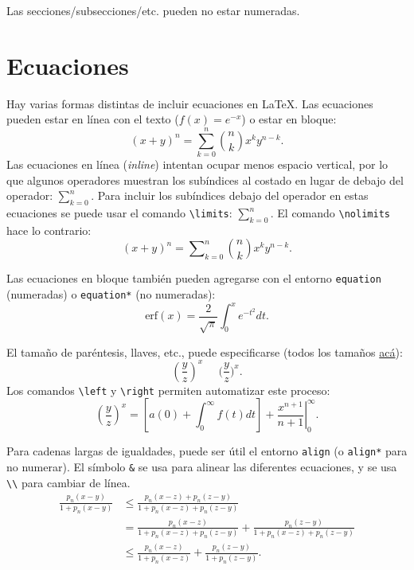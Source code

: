 \documentclass[12pt, spanish]{article}
\theoremstyle{definition} %
\theoremstyle{remark} %
\theoremstyle{plain} %
\theoremstyle{plain} %
\theoremstyle{plain} %
\theoremstyle{plain} %
\theoremstyle{plain} %
\theoremstyle{remark} %
\begin{document}
Las secciones/subsecciones/etc. pueden no estar numeradas.


\section{Ecuaciones}

Hay varias formas distintas de incluir ecuaciones en \LaTeX. Las ecuaciones pueden estar en línea con el texto ($f(x) = e^{-x}$) o estar en bloque: 
\[
(x+y)^n = \sum_{k=0}^n \binom{n}{k} x^k y^{n-k}.
\]
Las ecuaciones en línea (\textit{inline}) intentan ocupar menos espacio vertical, por lo que algunos operadores muestran los subíndices al costado en lugar de debajo del operador: $\sum_{k=0}^n$. Para incluir los subíndices debajo del operador en estas ecuaciones se puede usar el comando \verb|\limits|: $\sum\limits_{k=0}^n$. El comando \verb|\nolimits| hace lo contrario:
\[
(x+y)^n = \sum\nolimits_{k=0}^n \binom{n}{k} x^k y^{n-k}.
\]

Las ecuaciones en bloque también pueden agregarse con el entorno \verb|equation| (numeradas) o \verb|equation*| (no numeradas):
\begin{equation}
    \text{erf}(x) = \frac{2}{\sqrt{\pi}} \int_0^x e^{-t^2} dt.
\end{equation}

El tamaño de paréntesis, llaves, etc., puede especificarse (todos los tamaños \href{www.overleaf.com/learn/latex/Brackets_and_Parentheses}{acá}): \[
    (\frac{y}{z})^x\;\;\;\;\;\Big(\frac{y}{z}\Big)^x.
\]
Los comandos \verb|\left| y \verb|\right| permiten automatizar este proceso:
\[
    \left(\frac{y}{z}\right)^x = \left[ a(0) + \int_0^\infty f(t)dt\right] + \left. \frac{x^{n+1}}{n+1} \right|_0^\infty.
\]

Para cadenas largas de igualdades, puede ser útil el entorno \verb|align| (o \verb|align*| para no numerar). El símbolo \verb|&| se usa para alinear las diferentes ecuaciones, y se usa \verb|\\| para cambiar de línea.
\begin{align*}
    \frac{p_n(x - y)}{1 + p_n(x - y)} &\leq \frac{p_n(x - z) + p_n(z - y)}{1 + p_n(x - z) + p_n(z - y)} \\
    &= \frac{p_n(x - z)}{1 + p_n(x - z) + p_n(z - y)} + \frac{p_n(z - y)}{1 + p_n(x - z) + p_n(z - y)} \\
    &\leq \frac{p_n(x - z)}{1 + p_n(x - z)} + \frac{p_n(z - y)}{1 + p_n(z - y)}.
\end{align*}
\end{document}
